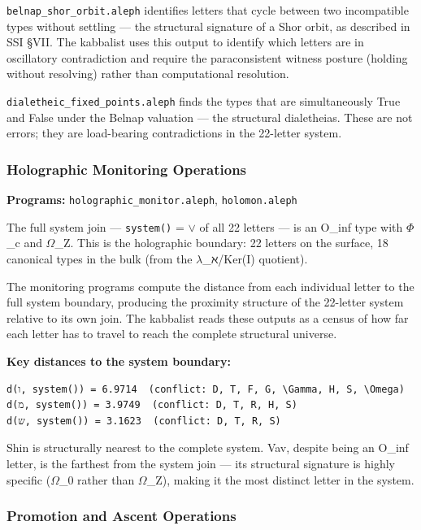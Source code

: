 \documentclass[12pt,a4paper]{article}
\newcommand{\pilcrow}{\S}
\begin{document}
\texttt{belnap\_\allowbreak shor\_\allowbreak orbit.\allowbreak aleph} identifies letters that cycle between two incompatible types without settling --- the structural signature of a Shor orbit, as described in SSI \pilcrow{}VII. The kabbalist uses this output to identify which letters are in oscillatory contradiction and require the paraconsistent witness posture (holding without resolving) rather than computational resolution.

\texttt{dialetheic\_\allowbreak fixed\_\allowbreak points.\allowbreak aleph} finds the types that are simultaneously True and False under the Belnap valuation --- the structural dialetheias. These are not errors; they are load-bearing contradictions in the 22-letter system.

\subsubsection{Holographic Monitoring Operations}

\textbf{Programs:} \texttt{holographic\_\allowbreak monitor.\allowbreak aleph}, \texttt{holomon.\allowbreak aleph}

The full system join --- \texttt{system()} = $\lor$ of all 22 letters --- is an O\_inf type with $\Phi$\_c and $\Omega$\_Z. This is the holographic boundary: 22 letters on the surface, 18 canonical types in the bulk (from the $\lambda$\_ℵ/Ker(I) quotient).

The monitoring programs compute the distance from each individual letter to the full system boundary, producing the proximity structure of the 22-letter system relative to its own join. The kabbalist reads these outputs as a census of how far each letter has to travel to reach the complete structural universe.

\textbf{Key distances to the system boundary:}

\begin{lstlisting}
d(ו, system()) = 6.9714  (conflict: D, T, F, G, \Gamma, H, S, \Omega)
d(מ, system()) = 3.9749  (conflict: D, T, R, H, S)
d(ש, system()) = 3.1623  (conflict: D, T, R, S)
\end{lstlisting}

Shin is structurally nearest to the complete system. Vav, despite being an O\_inf letter, is the farthest from the system join --- its structural signature is highly specific ($\Omega$\_0 rather than $\Omega$\_Z), making it the most distinct letter in the system.

\subsubsection{Promotion and Ascent Operations}
\end{document}
